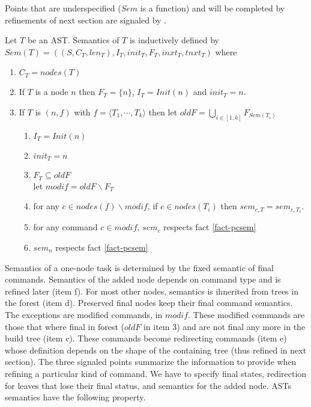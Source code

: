 \documentclass{article}
\begin{document}
Points that are underspecified ($Sem$ is a function) and will be completed by refinements of next section are signaled by \Mrk.
\begin{definition}\label{def-astsem} Let $T$ be an AST. Semantics of $T$ is inductively defined by $Sem(T)=((S, C_T, len_T), I_T, init_T, F_T, inxt_T, tnxt_T)$ where
\begin{enumerate}
\item $C_T=nodes(T)$
\item If $T$ is a node $n$ then $F_T=\{n\}$, $I_T=Init(n)$ and $init_T=n$.
\item If $T$ is $(n,f)$ with $f=\langle T_1,\cdots,T_k\rangle$ then let $oldF=\bigcup_{i\in[1,k]}F_{Sem(T_i)}$
  \begin{enumerate}
	\item $I_T=Init(n)$
	\item $init_T=n$
	\item $F_T\subseteq oldF$ \Mrk \\
        let $modif= oldF\backslash F_T$
	\item for any $c\in nodes(f)\backslash modif$, if $c\in nodes(T_i)$ then $sem_{c,T}=sem_{c,T_i}$.
	\item for any command $c\in modif$, $sem_c$ respects fact \ref{fact-pcsem} \Mrk
	\item $sem_n$ respects fact \ref{fact-pcsem} \Mrk
	\end{enumerate}
\end{enumerate}
\end{definition}
Semantics of a one-node task is determined by the fixed semantic of final commands. Semantics of the added node depends on command type and is refined later (item f). For most other nodes, semantics is ihnerited from trees in the forest (item d). Preserved final nodes keep their final command semantics. The exceptions are modified commands, in $modif$. These modified commands are those that where final in forest ($oldF$ in item 3) and are not final any more in the build tree (item c). These commands become redirecting commands (item e) whose definition depends on the shape of the containing tree (thus refined in next section). The three signaled points summarize the information to provide when refining a particular kind of command. We have to specify final states, redirection for leaves that lose their final status, and semantics for the added node. ASTs semantics have the following property.
\end{document}

